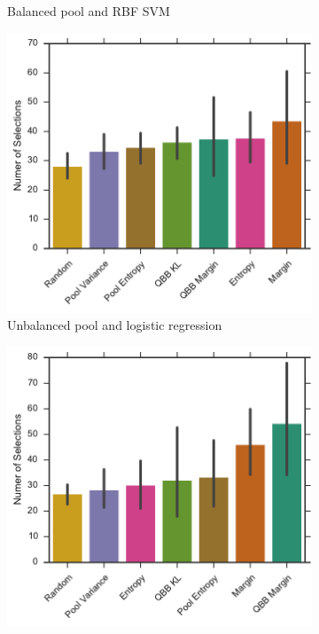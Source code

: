 \begin{figure}[p]
\begin{subfigure}{.5\textwidth}
        \caption{Balanced pool and RBF SVM}
        \label{fig:sdss_br_no_selections}
    \end{subfigure}
    \begin{subfigure}{.5\textwidth}
        \centering
        \includegraphics[width=\textwidth]{figures/5_thompson/sdss_ul_no_selections}
        \caption{Unbalanced pool and logistic regression}
        \label{fig:sdss_ul_no_selections}
    \end{subfigure}%
    \begin{subfigure}{.5\textwidth}
        \centering
        \includegraphics[width=\linewidth]{figures/5_thompson/sdss_ur_no_selections}

\end{subfigure}
\end{figure}

